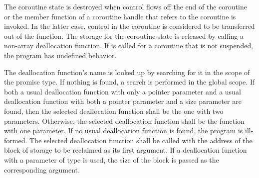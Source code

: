 \pnum
The coroutine state is destroyed when control flows off the end of the
coroutine or the  member
function
of a coroutine handle
that refers to the coroutine
is invoked.
In the latter case,
control in the coroutine is considered
to be transferred out of the function.
The storage for the coroutine state is released by calling a
non-array deallocation function.
If  is called for a coroutine that is not suspended, the
program has undefined behavior.
%
%
%
%
%

\pnum
The deallocation function's name is looked up by searching for it in the scope of the promise type.
If nothing is found, a search is performed in the
global scope. If both a usual deallocation
function with only a pointer parameter and a usual deallocation function with
both a pointer parameter and a size parameter are found, then the selected deallocation
function shall be the one with two parameters. Otherwise, the selected
deallocation function shall be the function with one parameter. If no usual
deallocation function is found, the program is ill-formed.
The selected deallocation function shall be called with the address of the
block of storage to be reclaimed as its first argument. If a deallocation
function with a parameter of type  is used, the size of
the block is passed as the corresponding argument.

